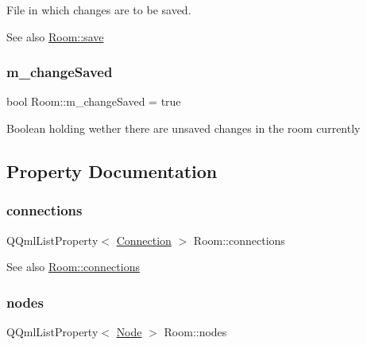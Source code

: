 File in which changes are to be saved. \begin{DoxySeeAlso}{See also}
\mbox{\hyperlink{classRoom_ad795aa64d503519ba0777e3f1d81e54c}{Room\+::save}} 
\end{DoxySeeAlso}
\mbox{\label{classRoom_aa6a3c11ef8f5d0253f4ddb763cfc3f53}} 
\subsubsection{\texorpdfstring{m\+\_\+change\+Saved}{m\_changeSaved}}
{\footnotesize\ttfamily bool Room\+::m\+\_\+change\+Saved = true\hspace{0.3cm}{\ttfamily [private]}}

Boolean holding wether there are unsaved changes in the room currently 

\subsection{Property Documentation}
\mbox{\label{classRoom_a393b843ae2ef099ee92633a17f560ec8}} 
\subsubsection{\texorpdfstring{connections}{connections}}
{\footnotesize\ttfamily Q\+Qml\+List\+Property$<$ \mbox{\hyperlink{classConnection}{Connection}} $>$ Room\+::connections\hspace{0.3cm}{\ttfamily [read]}}

\begin{DoxySeeAlso}{See also}
\mbox{\hyperlink{classRoom_a393b843ae2ef099ee92633a17f560ec8}{Room\+::connections}} 
\end{DoxySeeAlso}
\mbox{\label{classRoom_a775521f64541cbe3a8ae8a37a008a3c2}} 
\subsubsection{\texorpdfstring{nodes}{nodes}}
{\footnotesize\ttfamily Q\+Qml\+List\+Property$<$ \mbox{\hyperlink{classNode}{Node}} $>$ Room\+::nodes\hspace{0.3cm}{\ttfamily [read]}}

